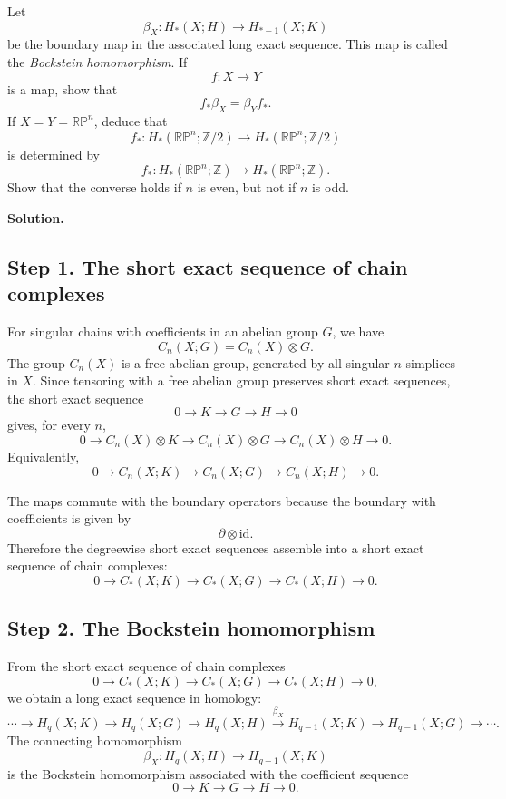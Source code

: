 \documentclass[12pt,a4paper]{article}
\theoremstyle{notespace}
\begin{document}
Let
\[
\beta_X:H_*(X;H)\longrightarrow H_{*-1}(X;K)
\]
be the boundary map in the associated long exact sequence. This map is called the \emph{Bockstein homomorphism}. If
\[
f:X\longrightarrow Y
\]
is a map, show that
\[
f_*\beta_X=\beta_Y f_*.
\]
If \(X=Y=\mathbb{RP}^n\), deduce that
\[
f_*:H_*(\mathbb{RP}^n;\mathbb Z/2)
\longrightarrow
H_*(\mathbb{RP}^n;\mathbb Z/2)
\]
is determined by
\[
f_*:H_*(\mathbb{RP}^n;\mathbb Z)
\longrightarrow
H_*(\mathbb{RP}^n;\mathbb Z).
\]
Show that the converse holds if \(n\) is even, but not if \(n\) is odd.

\medskip

\textbf{Solution.}

\subsection*{Step 1. The short exact sequence of chain complexes}

For singular chains with coefficients in an abelian group \(G\), we have
\[
C_n(X;G)=C_n(X)\otimes G.
\]
The group \(C_n(X)\) is a free abelian group, generated by all singular \(n\)-simplices in \(X\). Since tensoring with a free abelian group preserves short exact sequences, the short exact sequence
\[
0\longrightarrow K\longrightarrow G\longrightarrow H\longrightarrow 0
\]
gives, for every \(n\),
\[
0\longrightarrow C_n(X)\otimes K
\longrightarrow C_n(X)\otimes G
\longrightarrow C_n(X)\otimes H
\longrightarrow 0.
\]
Equivalently,
\[
0\longrightarrow C_n(X;K)
\longrightarrow C_n(X;G)
\longrightarrow C_n(X;H)
\longrightarrow 0.
\]

The maps commute with the boundary operators because the boundary with coefficients is given by
\[
\partial\otimes \mathrm{id}.
\]
Therefore the degreewise short exact sequences assemble into a short exact sequence of chain complexes:
\[
\boxed{
	0\longrightarrow C_*(X;K)
	\longrightarrow C_*(X;G)
	\longrightarrow C_*(X;H)
	\longrightarrow 0.
}
\]

\subsection*{Step 2. The Bockstein homomorphism}

From the short exact sequence of chain complexes
\[
0\longrightarrow C_*(X;K)
\longrightarrow C_*(X;G)
\longrightarrow C_*(X;H)
\longrightarrow 0,
\]
we obtain a long exact sequence in homology:
\[
\cdots
\longrightarrow
H_q(X;K)
\longrightarrow
H_q(X;G)
\longrightarrow
H_q(X;H)
\xrightarrow{\beta_X}
H_{q-1}(X;K)
\longrightarrow
H_{q-1}(X;G)
\longrightarrow
\cdots .
\]
The connecting homomorphism
\[
\beta_X:H_q(X;H)\longrightarrow H_{q-1}(X;K)
\]
is the Bockstein homomorphism associated with the coefficient sequence
\[
0\longrightarrow K\longrightarrow G\longrightarrow H\longrightarrow 0.
\]
\end{document}
